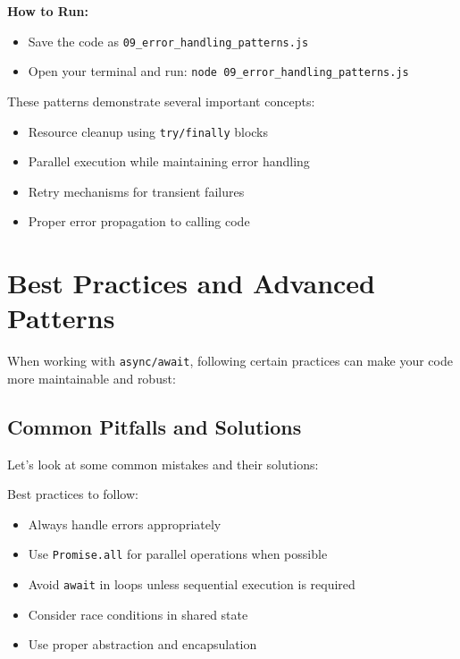 \textbf{How to Run:}
\begin{itemize}
    \item Save the code as \verb|09_error_handling_patterns.js|
    \item Open your terminal and run: \verb|node 09_error_handling_patterns.js|
\end{itemize}

\begin{macterminal}
  
\end{macterminal}

These patterns demonstrate several important concepts:

\begin{itemize}
    \item Resource cleanup using \texttt{\textcolor{accentColor}{try/finally}} blocks
    \item Parallel execution while maintaining error handling
    \item Retry mechanisms for transient failures
    \item Proper error propagation to calling code
\end{itemize}

\section{Best Practices and Advanced Patterns}

When working with \texttt{\textcolor{accentColor}{async/await}}, following certain practices can make your code more maintainable and robust:

\subsection{Common Pitfalls and Solutions}

Let's look at some common mistakes and their solutions:

\begin{macterminal}
  
\end{macterminal}

Best practices to follow:
\begin{itemize}
    \item Always handle errors appropriately
    \item Use \texttt{\textcolor{accentColor}{Promise.all}} for parallel operations when possible
    \item Avoid \texttt{\textcolor{accentColor}{await}} in loops unless sequential execution is required
    \item Consider race conditions in shared state
    \item Use proper abstraction and encapsulation
\end{itemize}

